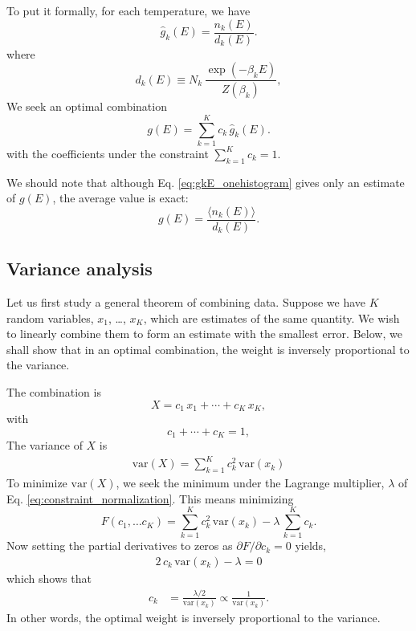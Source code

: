 \documentclass[aip,jcp,preprint,superscriptaddress]{revtex4-1}
\begin{document}
To put it formally,
for each temperature, we have
%
\begin{equation}
\hat g_k(E)
=
\frac{ n_k(E) }
     { d_k(E) }.
\label{eq:gkE_onehistogram}
\end{equation}
where
\begin{equation}
  d_k(E) \equiv N_k \, \frac{ \exp(-\beta_k E) } { Z(\beta_k) },
  \label{eq:dkE_def}
\end{equation}
%
We seek an optimal combination
%
\begin{equation}
g(E)
=
\sum_{k = 1}^K c_k \, \hat g_k(E).
\end{equation}
with the coefficients
under the constraint
$\sum_{k = 1}^K c_k = 1$.


We should note that
although Eq. \eqref{eq:gkE_onehistogram}
gives only an estimate of $g(E)$,
the average value is exact:
\begin{equation}
g(E)
=
\frac{ \langle n_k(E) \rangle}
     { d_k(E) }.
\label{eq:gkE_ave}
\end{equation}



\subsection{Variance analysis}



Let us first study a general theorem
of combining data.
%
Suppose we have $K$ random variables,
$x_1$, \dots, $x_K$,
which are estimates of the same quantity.
%
We wish to linearly combine them to
form an estimate with the smallest error.
%
Below, we shall show that
in an optimal combination,
the weight is inversely proportional to the variance.



The combination is
\[
  X = c_1 \, x_1 + \cdots + c_K \, x_K,
\]
with
\begin{equation}
  c_1 + \cdots + c_K = 1,
  \label{eq:constraint_normalization}
\end{equation}
%
The variance of $X$ is
%
\begin{align*}
  \mathrm{var}(X)
=
\sum_{k = 1}^K c_k^2 \, \mathrm{var}(x_k)
\end{align*}
%
To minimize $\mathrm{var}(X)$,
we seek the minimum
under the Lagrange multiplier,
$\lambda$ of Eq. \eqref{eq:constraint_normalization}.
%
This means minimizing
%
\begin{equation}
F(c_1, \dots c_K)
=
\sum_{k = 1}^K c_k^2 \, \mathrm{var}(x_k)
-\lambda \, \sum_{k = 1}^K c_k.
\end{equation}
%
Now
setting the partial derivatives to zeros as
$\partial F/\partial c_k = 0$
yields,
%
\begin{align*}
  2 \, c_k \, \mathrm{var}(x_k) - \lambda = 0
\end{align*}
%
which shows that
\begin{align*}
c_k
&= \frac{ \lambda/2 }{\mathrm{var}(x_k) }
\propto \frac{ 1 } { \mathrm{var}(x_k) }.
\end{align*}
In other words,
the optimal weight
is inversely proportional to the variance.
\end{document}
